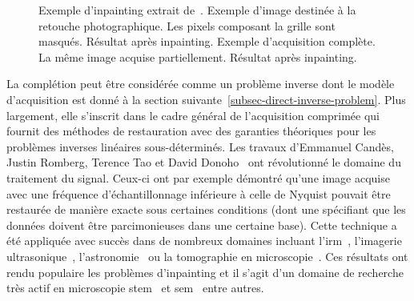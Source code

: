 \begin{figure}[b]
    \caption{Exemple d'inpainting extrait de~\protect\cite{peyre2011numerical}. \protect{} Exemple d'image destinée à la retouche photographique. \protect{} Les pixels composant la grille sont masqués. \protect{} Résultat après inpainting. \protect{} Exemple d'acquisition complète. \protect{} La même image acquise partiellement. \protect{} Résultat après inpainting.
        \protect\label{fig-inpainting}} 
\end{figure}


La complétion peut être considérée comme un problème inverse dont le modèle d'acquisition est donné à la section suivante~\ref{subsec-direct-inverse-problem}. Plus largement, elle s'inscrit dans le cadre général de l'acquisition comprimée qui fournit des méthodes de restauration avec des garanties théoriques pour les problèmes inverses linéaires sous-déterminés. Les travaux d'Emmanuel Candès, Justin Romberg, Terence Tao et David Donoho~\cite{candes2006near, candes2006stable, donoho2006compressed} ont révolutionné le domaine du traitement du signal. Ceux-ci ont par exemple démontré qu'une image acquise avec une fréquence d'échantillonnage inférieure à celle de Nyquist pouvait être restaurée de manière exacte sous certaines conditions (dont une spécifiant que les données doivent être parcimonieuses dans une certaine base). Cette technique a été appliquée avec succès dans de nombreux domaines incluant l'\gls{irm}~\cite{boyer_algorithm_2014}, l'imagerie ultrasonique~\cite{quinsac_bayesian_2011}, l'astronomie~\cite{bobin_compressed_2008} ou la tomographie en microscopie~\cite{binev2012compressed, jacob2019MM, jacob2018MM}. %
%
Ces résultats ont rendu populaire les problèmes d'inpainting et il s'agit d'un domaine de recherche très actif en microscopie \gls{stem}~\cite{beche2016compressed,stevens2014potential} et \gls{sem}~\cite{anderson2013sparse} entre autres.


